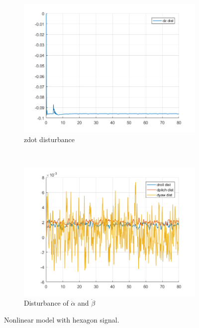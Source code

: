 \documentclass[11pt]{article}
\begin{document}
\begin{enumerate}
\begin{figure}[ht]
        \begin{subfigure}[c]{0.3\linewidth}
            \centering
            \includegraphics[width=\linewidth]{Plots_12_NonlinearModel_Hexagon/10}
            \caption{zdot disturbance}
        \end{subfigure}
        ~
        \begin{subfigure}[c]{0.3\linewidth}
            \centering
            \includegraphics[width=\linewidth]{Plots_12_NonlinearModel_Hexagon/11}
            \caption{Disturbance of $\dot{\alpha}$ and $\dot{\beta}$}
        \end{subfigure}
        
        \caption{Nonlinear model with hexagon signal.}
        \label{fig:nonlinear_model_hexagon_signal}
\end{figure}


\end{enumerate}
\end{document}
